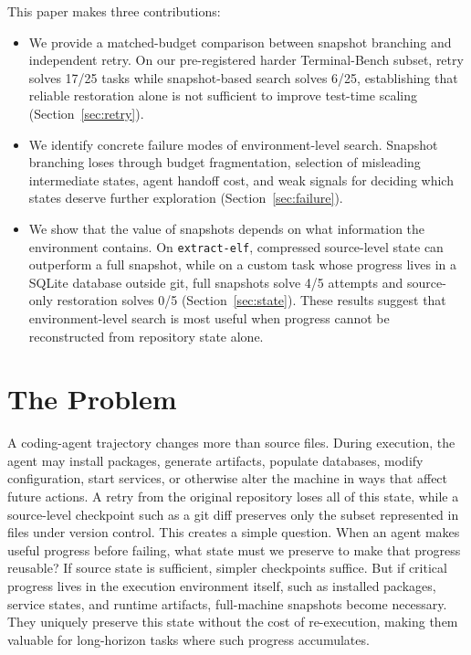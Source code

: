 \documentclass{article}
\begin{document}
This paper makes three contributions:
\begin{itemize}
    \item We provide a matched-budget comparison between snapshot branching and independent retry. On our pre-registered harder Terminal-Bench subset, retry solves 17/25 tasks while snapshot-based search solves 6/25, establishing that reliable restoration alone is not sufficient to improve test-time scaling (Section~\ref{sec:retry}).
    \item We identify concrete failure modes of environment-level search. Snapshot branching loses through budget fragmentation, selection of misleading intermediate states, agent handoff cost, and weak signals for deciding which states deserve further exploration (Section~\ref{sec:failure}).
    \item We show that the value of snapshots depends on what information the environment contains. On \texttt{extract-elf}, compressed source-level state can outperform a full snapshot, while on a custom task whose progress lives in a SQLite database outside git, full snapshots solve 4/5 attempts and source-only restoration solves 0/5 (Section~\ref{sec:state}). These results suggest that environment-level search is most useful when progress cannot be reconstructed from repository state alone.
\end{itemize}

\section{The Problem}
\label{sec:problem}

A coding-agent trajectory changes more than source files. During execution, the agent may install packages, generate artifacts, populate databases, modify configuration, start services, or otherwise alter the machine in ways that affect future actions. A retry from the original repository loses all of this state, while a source-level checkpoint such as a git diff preserves only the subset represented in files under version control. This creates a simple question. When an agent makes useful progress before failing, what state must we preserve to make that progress reusable? If source state is sufficient, simpler checkpoints suffice. But if critical progress lives in the execution environment itself, such as installed packages, service states, and runtime artifacts, full-machine snapshots become necessary. They uniquely preserve this state without the cost of re-execution, making them valuable for long-horizon tasks where such progress accumulates.
\end{document}

